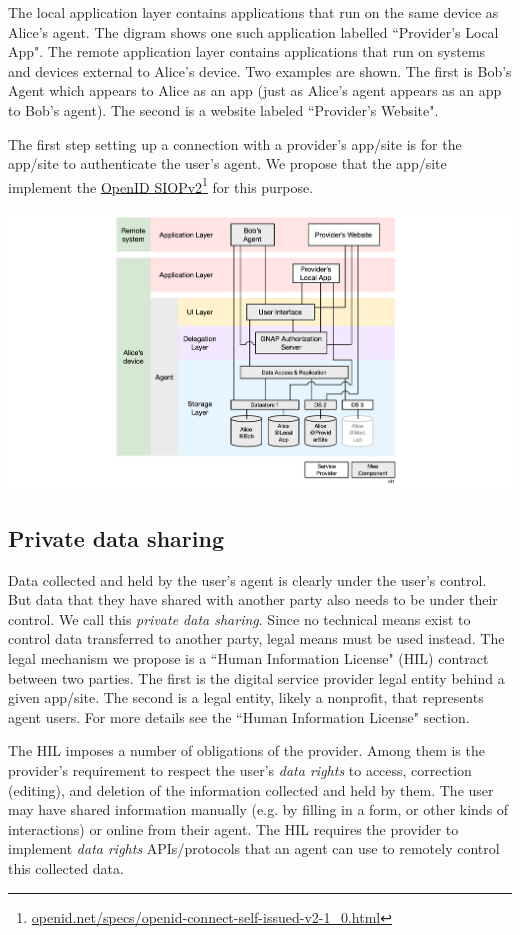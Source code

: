 \documentclass[11pt, oneside]{article}   	%
\newcommand{\hyperfootnote}[1][]{\def\ArgI{{#1}}\hyperfootnoteRelay}
\newcommand\hyperfootnoteRelay[2][]{\href{#1#2}{\ArgI}\footnote{\href{#1#2}{#2}}}
\begin{document}
The local application layer contains applications that run on the same device as Alice's agent. The digram shows one such application labelled ``Provider's Local App". The remote application layer contains applications that run on systems and devices external to Alice's device. Two examples are shown. The first is Bob's Agent which appears to Alice as an app (just as Alice's agent appears as an app to Bob's agent). The second is a website labeled ``Provider's Website". 

The first step setting up a connection with a provider's app/site is for the app/site to authenticate the user's agent. We propose that the app/site implement the \hyperfootnote[OpenID SIOPv2][https://]{openid.net/specs/openid-connect-self-issued-v2-1\_0.html} for this purpose.

\includegraphics[width=\textwidth]{./images/applications.png}

\subsection{Private data sharing}
Data collected and held by the user's agent is clearly under the user's control. But data that they have shared with another party also needs to be under their control. We call this \emph{private data sharing}. Since no technical means exist to control data transferred to another party, legal means must be used instead. The legal mechanism we propose is a ``Human Information License" (HIL) contract between two parties. The first is the digital service provider legal entity behind a given app/site. The second is a legal entity, likely a nonprofit, that represents agent users. For more details see the ``Human Information License" section.

The HIL imposes a number of obligations of the provider. Among them is the provider's requirement to respect the user's \emph{data rights} to access, correction (editing), and deletion of the information collected and held by them. The user may have shared information manually (e.g. by filling in a form, or other kinds of interactions) or online from their agent. The HIL requires the provider to implement \emph{data rights} APIs/protocols that an agent can use to remotely control this collected data.
\end{document}
